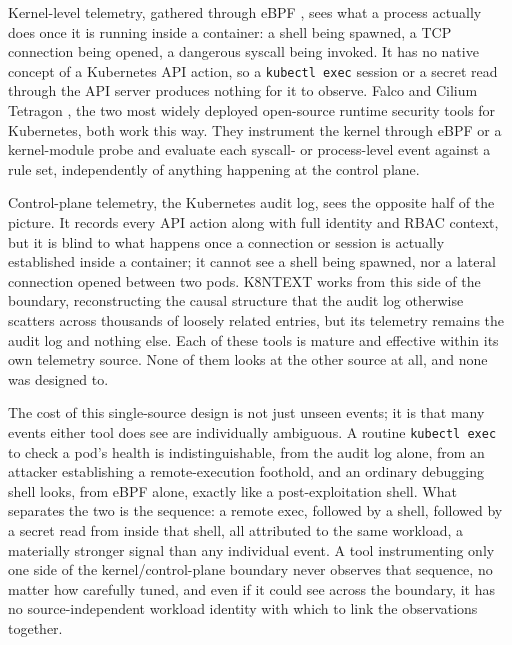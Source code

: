 \documentclass{ieeeaccess}
\begin{document}
Kernel-level telemetry, gathered through eBPF \cite{ref17}, sees what a
process actually does once it is running inside a container: a shell being
spawned, a TCP connection being opened, a dangerous syscall being
invoked. It has no native concept of a Kubernetes API action, so a
\texttt{kubectl exec} session or a secret read through the API server produces
nothing for it to observe. Falco \cite{ref1} and Cilium Tetragon \cite{ref2}, the two
most widely deployed open-source runtime security tools for Kubernetes,
both work this way. They instrument the kernel through eBPF or a
kernel-module probe and evaluate each syscall- or process-level event
against a rule set, independently of anything happening at the control
plane.

Control-plane telemetry, the Kubernetes audit log, sees the opposite
half of the picture. It records every API action along with full
identity and RBAC context, but it is blind to what happens once a
connection or session is actually established inside a container; it
cannot see a shell being spawned, nor a lateral connection opened
between two pods. K8NTEXT \cite{ref3} works from this side of the boundary,
reconstructing the causal structure that the audit log otherwise
scatters across thousands of loosely related entries, but its telemetry
remains the audit log and nothing else. Each of these tools is mature
and effective within its own telemetry source. None of them looks at
the other source at all, and none was designed to.

The cost of this single-source design is not just unseen events; it is
that many events either tool does see are individually ambiguous. A
routine \texttt{kubectl exec} to check a pod's health is indistinguishable,
from the audit log alone, from an attacker establishing a
remote-execution foothold, and an ordinary debugging shell looks, from
eBPF alone, exactly like a post-exploitation shell. What separates the
two is the sequence: a remote exec, followed by a shell, followed by a
secret read from inside that shell, all attributed to the same
workload, a materially stronger signal than any individual event. A
tool instrumenting only one side of the kernel/control-plane boundary
never observes that sequence, no matter how carefully tuned, and even
if it could see across the boundary, it has no source-independent
workload identity with which to link the observations together.
\end{document}
